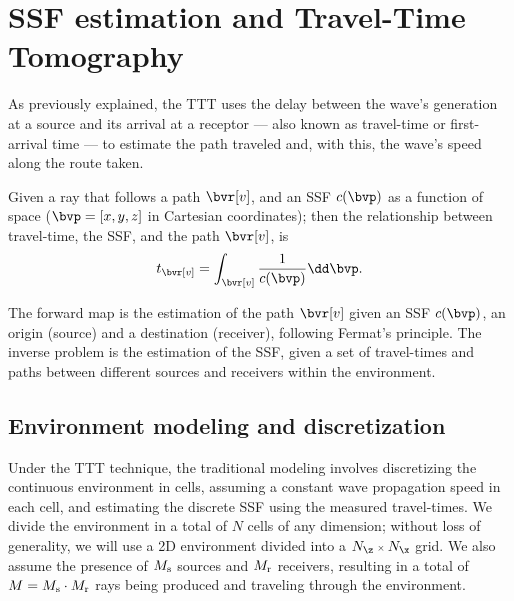 \section{SSF estimation and Travel-Time Tomography}
\label{sec:ssf_estimation}
As previously explained, the TTT uses the delay between the wave's generation at a source and its arrival at a receptor --- also known as travel-time or first-arrival time --- to estimate the path traveled and, with this, the wave's speed along the route taken.

Given a ray that follows a path $\bvr[v]$, and an SSF $c(\bvp)$ as a function of space ($\bvp=[x,y,z]$ in Cartesian coordinates); then the relationship between travel-time, the SSF, and the path $\bvr[v]$, is
\begin{equation}
	t_{\bvr[v]} = \int_{\bvr[v]} \frac{1}{c(\bvp)} \dd \bvp.
    \label{eq:sec2:continuous_travel-time}
\end{equation}

The forward map is the estimation of the path $\bvr[v]$ given an SSF $c(\bvp)$, an origin (source) and a destination (receiver), following Fermat's principle. The inverse problem is the estimation of the SSF, given a set of travel-times and paths between different sources and receivers within the environment.

\subsection{Environment modeling and discretization}

Under the TTT technique, the traditional modeling involves discretizing the continuous environment in cells, assuming a constant wave propagation speed in each cell, and estimating the discrete SSF using the measured travel-times. We divide the environment in a total of $N$ cells of any dimension; without loss of generality, we will use a 2D environment divided into a $\sz{N_{\z}}{N_{\x}}$ grid. We also assume the presence of $M_{\operatorname{s}}$ sources and $M_{\operatorname{r}}$ receivers, resulting in a total of $M = M_{\operatorname{s}} \cdot M_{\operatorname{r}}$ rays being produced and traveling through the environment.

